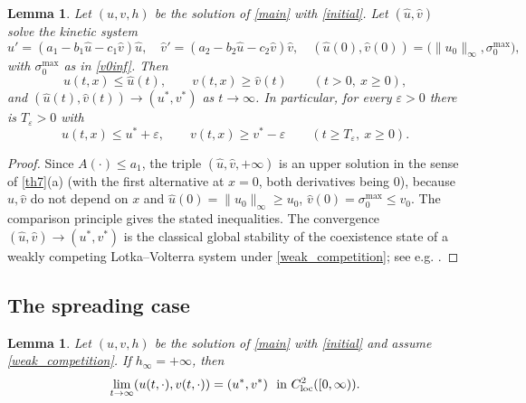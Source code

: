 \documentclass[reqno]{amsart}
\theoremstyle{plain}
\newtheorem{lemma}[theorem]{Lemma}
\theoremstyle{definition}
\theoremstyle{remark}
\begin{document}
\begin{lemma}\label{lem:vlow}
	Let $(u,v,h)$ be the solution of \eqref{main} with \eqref{initial}. Let
	$(\hat u,\hat v)$ solve the kinetic system
	\begin{equation}\label{ode}
		\hat u' = (a_1 - b_1\hat u - c_1 \hat v )\hat u,\quad
		\hat v' = (a_2 -b_2 \hat u - c_2 \hat v)\hat v,\quad
		(\hat{u}(0), \hat{v}(0)) = \big(\|u_0\|_\infty, \sigma_0^{\max}\big),
	\end{equation}
	with $\sigma_0^{\max}$ as in \eqref{v0inf}. Then
	\[
	u(t,x)\le\hat u(t),\qquad v(t,x)\ge\hat v(t)\qquad (t>0,\ x\ge0),
	\]
	and $(\hat u(t),\hat v(t))\to(u^*,v^*)$ as $t\to\infty$. In particular, for
	every $\varepsilon>0$ there is $T_\varepsilon>0$ with
	\begin{equation}\label{eq:uv_global}
		u(t,x)\le u^*+\varepsilon,\qquad v(t,x)\ge v^*-\varepsilon
		\qquad (t\ge T_\varepsilon,\ x\ge0).
	\end{equation}
\end{lemma}

\begin{proof}
	Since $A(\cdot)\le a_1$, the triple $(\hat u,\hat v,+\infty)$ is an upper
	solution in the sense of \cref{th7}(a) (with the first alternative at $x=0$,
	both derivatives being $0$), because $\hat u,\hat v$ do not depend on $x$ and
	$\hat u(0)=\|u_0\|_\infty\ge u_0$, $\hat v(0)=\sigma_0^{\max}\le v_0$. The
	comparison principle gives the stated inequalities. The convergence
	$(\hat u,\hat v)\to(u^*,v^*)$ is the classical global stability of the
	coexistence state of a weakly competing Lotka--Volterra system under
	\eqref{weak_competition}; see e.g. \cite[Chapter 4]{MR1319817}.
\end{proof}

\subsection{The spreading case}

\begin{lemma}\label{th1:lm2}
	Let $(u,v,h)$ be the solution of \eqref{main} with \eqref{initial} and assume
	\eqref{weak_competition}. If $h_\infty=+\infty$, then
	\[
	\lim_{t\to\infty} (u(t,\cdot), v(t,\cdot)) = (u^*, v^*)\ \text{ in } C^2_{\rm loc}([0, \infty)).
	\]
\end{lemma}
\end{document}
